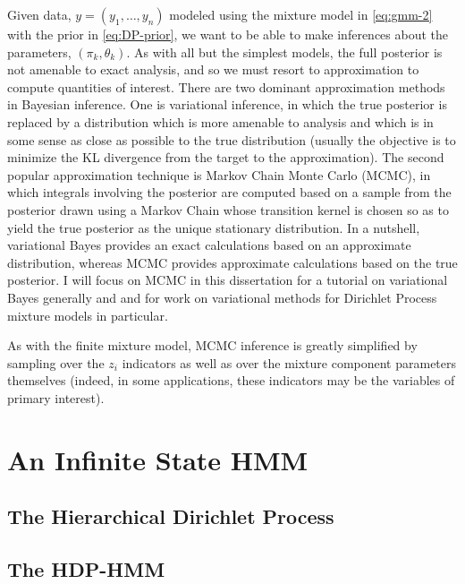   Given data, $y = (y_1, \dots, y_n)$ modeled using the mixture
  model in \eqref{eq:gmm-2} with the prior in \eqref{eq:DP-prior}, 
  we want to be able to make inferences about the parameters, $(\pi_k,
  \theta_k)$.  As with all but the simplest models, the full posterior
  is not amenable to exact analysis, and so we must resort to
  approximation to compute quantities of interest.  There are two
  dominant approximation methods in Bayesian inference.  One is variational
  inference, in which the true posterior is replaced by a distribution
  which is more amenable to analysis and which is in some sense as
  close as possible to the true distribution (usually the objective is
  to minimize the KL divergence from the target to the
  approximation).  The second popular approximation technique is
  Markov Chain Monte Carlo (MCMC), in which integrals involving the posterior
  are computed based on a sample from the posterior drawn using a
  Markov Chain whose transition kernel is chosen so as to yield the
  true posterior as the unique stationary distribution.  In a
  nutshell, variational Bayes provides an exact calculations based on an
  approximate distribution, whereas MCMC provides approximate
  calculations based on the true posterior.  I will focus on MCMC in
  this dissertation \citet{fox2012tutorial} for a tutorial on
  variational Bayes generally and \citet{blei2006variational} and
  \citet{kurihara2007collapsed} for work on variational methods for
  Dirichlet Process mixture models in particular.
  
  As with the finite mixture model, MCMC inference is greatly
  simplified by sampling over the $z_i$ indicators as well as over the
  mixture component parameters themselves (indeed, in some
  applications, these indicators may be the variables of primary interest).

\label{sec:dirichl-proc-gauss}

\section{An Infinite State HMM}
\label{sec:an-infinite-state}

\subsection{The Hierarchical Dirichlet Process}
\label{sec:hier-dirichl-proc}

\subsection{The HDP-HMM}
\label{sec:hdp-hmm}

